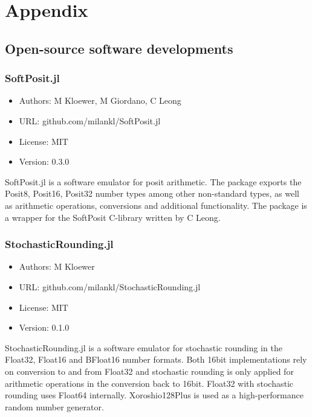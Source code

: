 \chapter{Appendix}
\renewcommand{\thechapter}{A}

\section{Open-source software developments}
\label{sec:open}

\subsection{SoftPosit.jl}

\begin{itemize}
    \setlength\itemsep{-5pt}
    \item Authors: M Kloewer, M Giordano, C Leong
    \item URL: github.com/milankl/SoftPosit.jl
    \item License: MIT
    \item Version: 0.3.0
\end{itemize}

SoftPosit.jl is a software emulator for posit arithmetic. The package exports the Posit8, Posit16, Posit32 number types among other non-standard types, as well as arithmetic operations, conversions and additional functionality. The package is a wrapper for the SoftPosit C-library written by C Leong.

\subsection{StochasticRounding.jl}

\begin{itemize}
    \setlength\itemsep{-5pt}
    \item Authors: M Kloewer
    \item URL: github.com/milankl/StochasticRounding.jl
    \item License: MIT
    \item Version: 0.1.0
\end{itemize}

StochasticRounding.jl is a software emulator for stochastic rounding in the Float32, Float16 and BFloat16 number formats. Both 16bit implementations rely on conversion to and from Float32 and stochastic rounding is only applied for arithmetic operations in the conversion back to 16bit. Float32 with stochastic rounding uses Float64 internally. Xoroshio128Plus is used as a high-performance random number generator.

